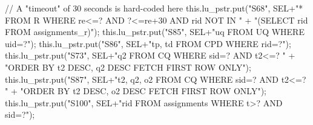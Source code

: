 // A "timeout" of 30 seconds is hard-coded here
this.lu_pstr.put("S68", SEL+"* FROM R WHERE re<=? AND ?<=re+30 AND rid NOT IN  "
      + "(SELECT rid FROM assignments_r)");
\eatline
{}\nwendcode{}\endmoddef{}
this.lu_pstr.put("S85", SEL+"uq FROM UQ WHERE uid=?");
\eatline
{}\nwendcode{}\endmoddef{}
this.lu_pstr.put("S86", SEL+"tp, td FROM CPD WHERE rid=?");
\eatline
{}\nwendcode{}\endmoddef{}
this.lu_pstr.put("S73", SEL+"q2 FROM CQ WHERE sid=? AND t2<=? "
      + "ORDER BY t2 DESC, q2 DESC FETCH FIRST ROW ONLY");
\eatline
{}\nwendcode{}\endmoddef{}
this.lu_pstr.put("S87", SEL+"t2, q2, o2 FROM CQ WHERE sid=? AND t2<=? "
      + "ORDER BY t2 DESC, o2 DESC FETCH FIRST ROW ONLY");
\eatline
{}\nwendcode{}\endmoddef{}
this.lu_pstr.put("S100", SEL+"rid FROM assignments WHERE t>? AND sid=?");
\eatline
{}\nwendcode{}\endmoddef{}
